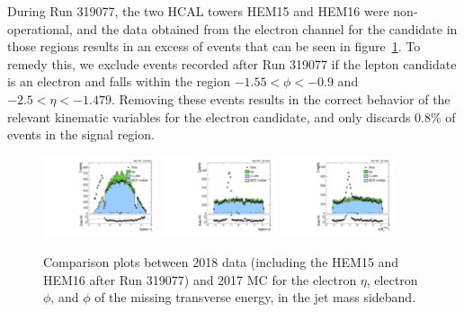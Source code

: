 During Run 319077, the two HCAL towers HEM15 and HEM16 were non-operational, and the data obtained from the electron channel for the \Wtolnu candidate in those regions results in an excess of events that can be seen in figure~\ref{fig:SB_controlPlots2018_electronexcess}. %
To remedy this, we exclude events recorded after Run 319077 if the lepton candidate is an electron and falls within the region $-1.55<\phi<-0.9$ and $-2.5<\eta<-1.479$.
Removing these events results in the correct behavior of the relevant kinematic variables for the electron candidate, and only discards 0.8\% of events in the signal region.

\begin{figure}[htbp]
  \centering
  \includegraphics[width=0.30\textwidth]{fig/controlPlots/SB_e_2018_lnujj_l1_l_eta.pdf}
  \includegraphics[width=0.30\textwidth]{fig/controlPlots/SB_e_2018_lnujj_l1_l_phi.pdf}
  \includegraphics[width=0.30\textwidth]{fig/controlPlots/SB_e_2018_met_phi.pdf}
  \caption{
    Comparison plots between 2018 data (including the HEM15 and HEM16 after Run 319077) and 2017 MC for the electron $\eta$, electron $\phi$, and $\phi$ of the missing transverse energy, in the jet mass sideband.
  }
  \label{fig:SB_controlPlots2018_electronexcess}
\end{figure}

